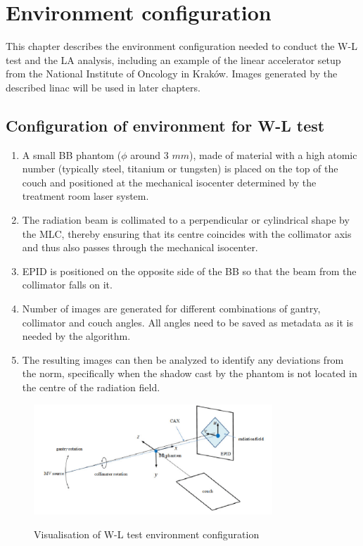 \chapter{Environment configuration} \label{chr:envSetup}

This chapter describes the environment configuration needed to conduct the W-L test and the LA analysis, including an example of the linear accelerator setup from the National Institute of Oncology in Kraków. Images generated by the described linac will be used in later chapters.

\section{Configuration of environment for W-L test}

\begin{enumerate}
    \item A small BB phantom ($\phi$ around 3 $mm$), made of material with a high atomic number (typically steel, titanium or tungsten) is placed on the top of the couch and positioned at the mechanical isocenter determined by the treatment room laser system.

    \item The radiation beam is collimated to a perpendicular or cylindrical shape by the MLC, thereby ensuring that its centre coincides with the collimator axis and thus also passes through the mechanical isocenter.

    \item EPID is positioned on the opposite side of the BB so that the beam from the collimator falls on it.

    \item Number of images are generated for different combinations of gantry, collimator and couch angles. All angles need to be saved as metadata as it is needed by the algorithm.

    \item The resulting images can then be analyzed to identify any deviations from the norm, specifically when the shadow cast by the phantom is not located in the centre of the radiation field. \cite{wl_test_setup}

\end{enumerate}

\begin{figure}[H]
    \centering
    \includegraphics[width=0.8\textwidth]{Content/Images/wl_setup.png}
    \caption{Visualisation of W-L test environment configuration} \cite{wl_test_setup_image}
\end{figure}

